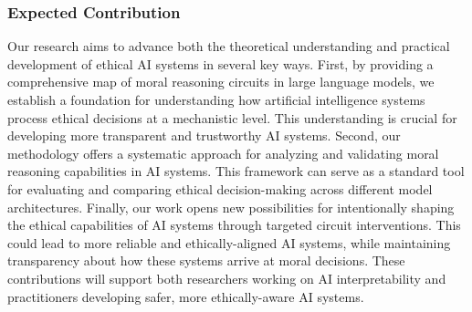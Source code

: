 \subsubsection*{Expected Contribution}

Our research aims to advance both the theoretical understanding and practical development of ethical AI systems in several key ways.
First, by providing a comprehensive map of moral reasoning circuits in large language models, we establish a foundation for understanding how artificial intelligence systems process ethical decisions at a mechanistic level. This understanding is crucial for developing more transparent and trustworthy AI systems.
Second, our methodology offers a systematic approach for analyzing and validating moral reasoning capabilities in AI systems. This framework can serve as a standard tool for evaluating and comparing ethical decision-making across different model architectures.
Finally, our work opens new possibilities for intentionally shaping the ethical capabilities of AI systems through targeted circuit interventions. This could lead to more reliable and ethically-aligned AI systems, while maintaining transparency about how these systems arrive at moral decisions.
These contributions will support both researchers working on AI interpretability and practitioners developing safer, more ethically-aware AI systems. 




